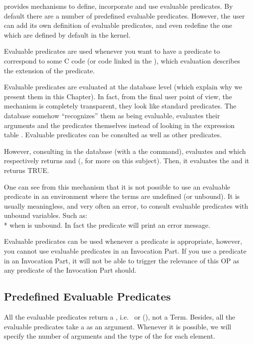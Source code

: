 \COPRS{} provides mechanisms to define, incorporate and use evaluable
predicates. By default there are a number of predefined
evaluable predicates. However, the user can add its own
definition of evaluable predicates, and even redefine the
one which are defined by default in the kernel.

Evaluable predicates are used whenever you want to have a predicate to
correspond to some C code (or code linked in the \CPK{}), which
evaluation describes the extension of the predicate.

Evaluable predicates are evaluated at the database level (which explain
why we present them in this Chapter). In fact, from the final user point of
view, the mechanism is completely transparent, they look like standard predicates. The
database somehow ``recognizes'' them as being evaluable, evaluates
their arguments and the predicates themselves instead of looking in the
expression table . Evaluable predicates can be consulted as well as other
predicates.

However, consulting  in the database (with a
the  command), evaluates  and  which respectively returns  and  (, for more on this subject). Then, it
evaluates the  and it returns TRUE.

One can see from this mechanism that it is not possible to use an evaluable
predicate in an environment where the terms are undefined (or unbound). It is
usually meaningless, and very often an error, to consult evaluable predicates
with unbound variables. Such as:\\*  when  is unbound.
In fact the \code{>} predicate will print an error message.

Evaluable predicates can be used whenever a predicate is appropriate,
however, you cannot use evaluable predicates in an Invocation Part. If you
use a predicate in an Invocation Part, it will not be able to trigger the
relevance of this OP as any predicate of the Invocation Part should.


\subsection{Predefined Evaluable Predicates}

All the evaluable predicates return a , i.e.\  or
 (), not a Term. Besides, all the
evaluable predicates take a  as an argument. Whenever it is
possible, we will specify the number of arguments and the type of the
 for each element.

